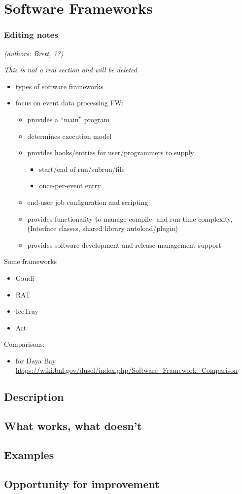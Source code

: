 \section{Software Frameworks}
\subsubsection{Editing notes}

\textit{(authors: Brett, ??)}

\textit{This is not a real section and will be deleted}

\begin{itemize}
\item types of software frameworks
\item focus on event data processing FW:
  \begin{itemize}
  \item provides a ``main'' program
  \item determines execution model
  \item provides hooks/entries for user/programmers to supply
    \begin{itemize}
    \item start/end of run/subrun/file
    \item once-per-event entry
    \end{itemize}
  \item end-user job configuration and scripting
  \item provides functionality to manage compile- and run-time complexity, (Interface classes, shared library autoload/plugin)
  \item provides software development and release management support
  \end{itemize}
\end{itemize}
Some frameworks
\begin{itemize}
\item Gaudi
\item RAT
\item IceTray
\item Art
\end{itemize}
Comparisons:
\begin{itemize}
\item for Daya Bay \url{https://wiki.bnl.gov/dusel/index.php/Software_Framework_Comparison}
\end{itemize}

\subsection{Description}
\subsection{What works, what doesn't}
\subsection{Examples}
\subsection{Opportunity for improvement}
